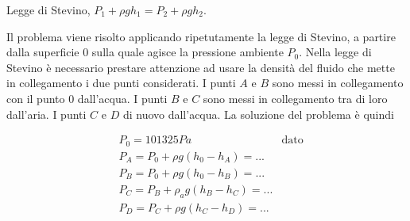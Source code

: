 \sol

\partone
 Legge di Stevino, $ P_1 + \rho g h_1 = P_2 + \rho g h_2$.
\vspace{0.5cm}

\parttwo
Il problema viene risolto applicando ripetutamente la legge di Stevino,
 a partire dalla superficie $0$ sulla quale agisce la pressione ambiente
 $P_0$. Nella legge di Stevino è necessario prestare attenzione ad usare
 la densità del fluido che mette in collegamento i due punti considerati.
I punti $A$ e $B$ sono messi in collegamento con il punto $0$ dall'acqua.
 I punti $B$ e $C$ sono messi in collegamento tra di loro dall'aria. I punti
 $C$ e $D$ di nuovo dall'acqua. La soluzione del problema è quindi
 
\begin{equation}
\begin{aligned}
 & P_0 = 101325 Pa & \text{dato} \\
 & P_A = P_0 + \rho g (h_0 - h_A) = ... \\
 & P_B = P_0 + \rho g (h_0 - h_B) = ... \\
 & P_C = P_B + \rho_a g (h_B - h_C) = ... \\
 & P_D = P_C + \rho g (h_C - h_D) = ... 
\end{aligned}
\end{equation}
